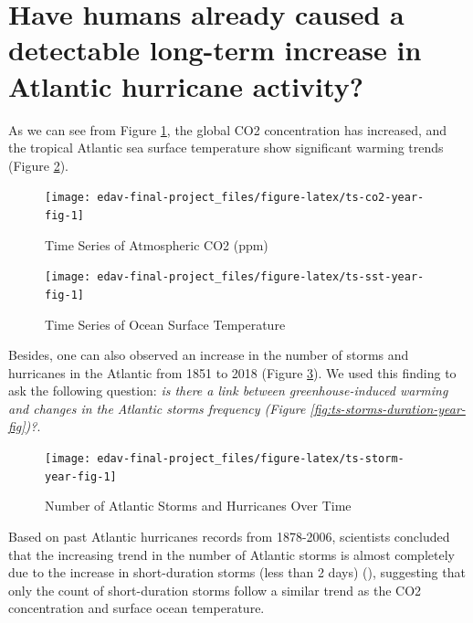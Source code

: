 \documentclass[]{book}
\begin{document}
\hypertarget{have-humans-already-caused-a-detectable-long-term-increase-in-atlantic-hurricane-activity}{%
\section{Have humans already caused a detectable long-term increase in Atlantic hurricane activity?}\label{have-humans-already-caused-a-detectable-long-term-increase-in-atlantic-hurricane-activity}}

As we can see from Figure \ref{fig:ts-co2-year-fig}, the global CO2 concentration has increased, and the tropical Atlantic sea surface temperature show significant warming trends (Figure \ref{fig:ts-sst-year-fig}).

\begin{figure}

{\centering \texttt{[image: edav-final-project\_files/figure-latex/ts-co2-year-fig-1]} 

}

\caption{Time Series of Atmospheric CO2 (ppm)}\label{fig:ts-co2-year-fig}
\end{figure}

\begin{figure}

{\centering \texttt{[image: edav-final-project\_files/figure-latex/ts-sst-year-fig-1]} 

}

\caption{Time Series of Ocean Surface Temperature}\label{fig:ts-sst-year-fig}
\end{figure}

Besides, one can also observed an increase in the number of storms and hurricanes in the Atlantic from 1851 to 2018 (Figure \ref{fig:ts-storm-year-fig}). We used this finding to ask the following question: \emph{is there a link between greenhouse-induced warming and changes in the Atlantic storms frequency (Figure \ref{fig:ts-storms-duration-year-fig})?}.

\begin{figure}

{\centering \texttt{[image: edav-final-project\_files/figure-latex/ts-storm-year-fig-1]} 

}

\caption{Number of Atlantic Storms and Hurricanes Over Time}\label{fig:ts-storm-year-fig}
\end{figure}

Based on past Atlantic hurricanes records from 1878-2006, scientists concluded that the increasing trend in the number of Atlantic storms is almost completely due to the increase in short-duration storms (less than 2 days) (\citet{Landsea2010}), suggesting that only the count of short-duration storms follow a similar trend as the CO2 concentration and surface ocean temperature.
\end{document}
